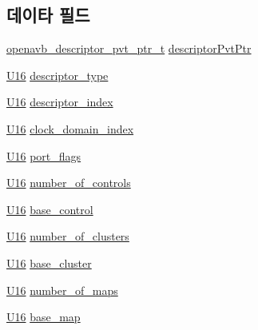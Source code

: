 \subsection*{데이타 필드}
\begin{DoxyCompactItemize}
\item 
\hyperlink{openavb__aem__pub_8h_a85eabab4b7d2466e94c1c3b43b11371d}{openavb\+\_\+descriptor\+\_\+pvt\+\_\+ptr\+\_\+t} \hyperlink{structopenavb__aem__descriptor__stream__port__io__t_a302e92fd6cf4d398d5305395359fb157}{descriptor\+Pvt\+Ptr}
\item 
\hyperlink{openavb__types__base__pub_8h_a0a0a322d5fa4a546d293a77ba8b4a71f}{U16} \hyperlink{structopenavb__aem__descriptor__stream__port__io__t_a1e231d7874aada5925b29affc76782cc}{descriptor\+\_\+type}
\item 
\hyperlink{openavb__types__base__pub_8h_a0a0a322d5fa4a546d293a77ba8b4a71f}{U16} \hyperlink{structopenavb__aem__descriptor__stream__port__io__t_ab26fb363c24b9a2a4391f9171c981b08}{descriptor\+\_\+index}
\item 
\hyperlink{openavb__types__base__pub_8h_a0a0a322d5fa4a546d293a77ba8b4a71f}{U16} \hyperlink{structopenavb__aem__descriptor__stream__port__io__t_a6bf82a91e71555466bdcba713002b1ff}{clock\+\_\+domain\+\_\+index}
\item 
\hyperlink{openavb__types__base__pub_8h_a0a0a322d5fa4a546d293a77ba8b4a71f}{U16} \hyperlink{structopenavb__aem__descriptor__stream__port__io__t_a2fd7e2f507df1c9941b168d66a46e145}{port\+\_\+flags}
\item 
\hyperlink{openavb__types__base__pub_8h_a0a0a322d5fa4a546d293a77ba8b4a71f}{U16} \hyperlink{structopenavb__aem__descriptor__stream__port__io__t_ab8a96da60faf5e9dfdef4464fbfd5288}{number\+\_\+of\+\_\+controls}
\item 
\hyperlink{openavb__types__base__pub_8h_a0a0a322d5fa4a546d293a77ba8b4a71f}{U16} \hyperlink{structopenavb__aem__descriptor__stream__port__io__t_af2706407b5397c06e6f4c45474ba75d3}{base\+\_\+control}
\item 
\hyperlink{openavb__types__base__pub_8h_a0a0a322d5fa4a546d293a77ba8b4a71f}{U16} \hyperlink{structopenavb__aem__descriptor__stream__port__io__t_a730f51131a874beaf03eeca3f089feec}{number\+\_\+of\+\_\+clusters}
\item 
\hyperlink{openavb__types__base__pub_8h_a0a0a322d5fa4a546d293a77ba8b4a71f}{U16} \hyperlink{structopenavb__aem__descriptor__stream__port__io__t_a8ec7bc49bd5addbc5a5004b78d22db14}{base\+\_\+cluster}
\item 
\hyperlink{openavb__types__base__pub_8h_a0a0a322d5fa4a546d293a77ba8b4a71f}{U16} \hyperlink{structopenavb__aem__descriptor__stream__port__io__t_ac27f7ac6db370cdf63a7d34635c5601d}{number\+\_\+of\+\_\+maps}
\item 
\hyperlink{openavb__types__base__pub_8h_a0a0a322d5fa4a546d293a77ba8b4a71f}{U16} \hyperlink{structopenavb__aem__descriptor__stream__port__io__t_aa9632860d31304f28ba695a1a44f62c5}{base\+\_\+map}
\end{DoxyCompactItemize}


